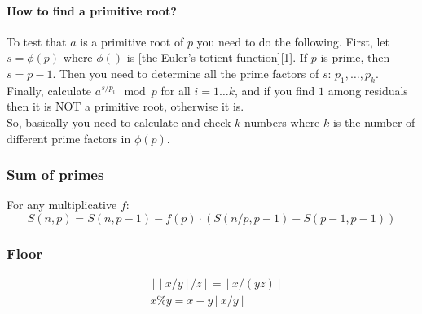 \documentclass[13pt,a4paper]{article}
\begin{document}
\begin{landscape}
\begin{multicols*}{3}
\paragraph{How to find a primitive root?}
To test that $a$ is a primitive root of $p$ you need to do the following. First, let $s=\phi(p)$ where $\phi()$ is [the Euler's totient function][1]. If $p$ is prime, then $s=p-1$. Then you need to determine all the prime factors of $s$: $p_1,\ldots,p_k$. Finally, calculate $a^{s/p_i}\mod p$ for all $i=1\ldots k$, and if you find $1$ among residuals then it is NOT a primitive root, otherwise it is.\\
So, basically you need to calculate and check $k$ numbers where $k$ is the number of different prime factors in $\phi(p)$.
\subsubsection{Sum of primes} For any multiplicative $f$:
\[
S(n,p) = S(n, p-1) - f(p) \cdot (S(n/p,p-1) - S(p-1,p-1))
\]

\subsubsection{Floor}
\begin{align*}
&\left\lfloor \left\lfloor x/y \right\rfloor / z \right\rfloor = \left\lfloor x / (yz) \right\rfloor \\
&x \% y = x - y \left\lfloor x / y \right\rfloor
\end{align*}

\clearpage
\end{multicols*}
\endgroup
\end{landscape}
\end{document}
